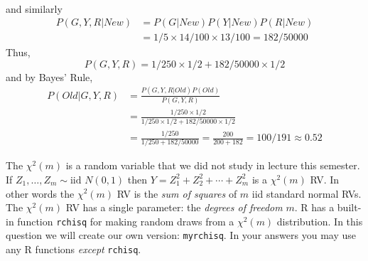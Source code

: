 \documentclass[addpoints,12pt]{exam}
\begin{document}
\begin{questions}
\begin{solution}[6in]
\begin{align*}
\end{align*}
and similarly
\begin{align*}
P(G,Y,R|New) &= P(G|New)P(Y|New)P(R|New)\\
&= 1/5 \times 14/100 \times 13/100 = 182/50000
\end{align*}
Thus,
\[P(G,Y,R) = 1/250 \times 1/2 + 182/50000 \times 1/2\]
and by Bayes' Rule,
\begin{align*}
  P(Old|G,Y,R) &= \frac{P(G,Y,R|Old)P(Old)}{P(G,Y,R)}\\
  &= \frac{1/250 \times 1/2}{1/250 \times 1/2 + 182/50000 \times 1/2}\\
  &= \frac{1/250}{1/250 + 182/50000} = \frac{200}{200 + 182}= 100/191 \approx 0.52
\end{align*}
\end{solution}

  \question The $\chi^2(m)$ is a random variable that we did not study in lecture this semester. 
  If $Z_1, \dots, Z_m \sim \mbox{iid } N(0,1)$ then $Y = Z_1^2 + Z_2^2 + \cdots + Z_m^2$ is a $\chi^2(m)$ RV.
  In other words the $\chi^2(m)$ RV is the \emph{sum of squares} of $m$ iid standard normal RVs.
  The $\chi^2(m)$ RV has a single parameter: the \emph{degrees of freedom} $m$.
  R has a built-in function \texttt{rchisq} for making random draws from a $\chi^2(m)$ distribution.
  In this question we will create our own version: \texttt{myrchisq}.
    In your answers you may use any R functions \emph{except} \texttt{rchisq}.
\end{questions}
\end{document}
